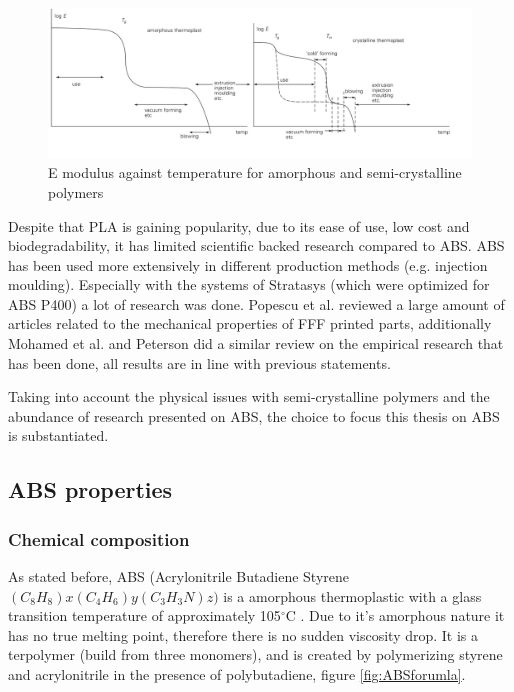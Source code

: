 \begin{figure}[H]
    \centering
    \includegraphics[width=1\textwidth]{chapter_2/figures/EvsT.PNG}
    \caption{E modulus against temperature for amorphous and semi-crystalline polymers \cite{Vegt2001FromPlastics}}
    \label{fig:EvsT}
\end{figure}

Despite that PLA is gaining popularity, due to its ease of use, low cost and biodegradability, it has limited scientific backed research compared to ABS. ABS has been used more extensively in different production methods (e.g. injection moulding). Especially with the systems of Stratasys (which were optimized for ABS P400) a lot of research was done. Popescu et al. \cite{Popescu2018FDMReview} reviewed a large amount of articles related to the mechanical properties of FFF printed parts, additionally Mohamed et al. \cite{Mohamed2015OptimizationProspects} and Peterson \cite{Peterson2019ReviewPerspective} did a similar review on the empirical research that has been done, all results are in line with previous statements.  

Taking into account the physical issues with semi-crystalline polymers and the abundance of research presented on ABS, the choice to focus this thesis on ABS is substantiated.

\subsection{ABS properties}
    \label{ABS properties}
 \subsubsection{Chemical composition}
As stated before, ABS (Acrylonitrile Butadiene Styrene $(C_8H_8)x (C_4H_6)y (C_3H_3N)z)$ is a amorphous thermoplastic with a glass transition temperature of approximately 105$^{\circ}$C \cite{Peterson2019ReviewPerspective}. Due to it's amorphous nature it has no true melting point, therefore there is no sudden viscosity drop. It is a terpolymer (build from three monomers), and is created by polymerizing styrene and acrylonitrile in the presence of polybutadiene, figure \ref{fig:ABSforumla}.

